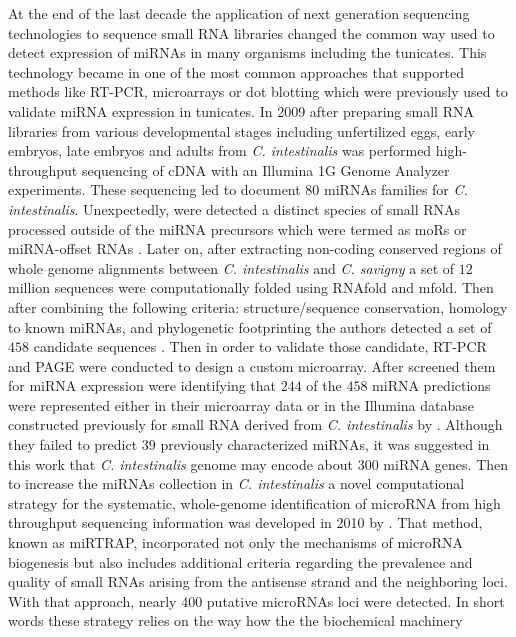\documentclass[graybox]{svmult}
\begin{document}
At the end of the last decade the application of next generation sequencing 
technologies to sequence small RNA libraries changed the common way used to 
detect expression of miRNAs in many organisms including the tunicates. This 
technology became in one of the most common approaches that supported methods 
like RT-PCR, microarrays or dot blotting which were previously used to validate 
miRNA expression in tunicates. In 2009 after preparing small RNA libraries from 
various developmental stages including unfertilized eggs, early embryos, late 
embryos and adults from  \textit{C. intestinalis} was performed high-throughput 
sequencing of cDNA with an Illumina 1G Genome Analyzer experiments. These 
sequencing led to document $80$ miRNAs families for  \textit{C. intestinalis}. 
Unexpectedly, were detected a distinct species of small RNAs processed outside 
of the miRNA precursors which were termed as moRs or miRNA-offset RNAs 
\cite{Shi2009}. Later on, after extracting non-coding conserved regions of whole 
genome alignments between  \textit{C. intestinalis} and \textit{C. savigny} a 
set of $12$ million sequences were computationally folded using RNAfold and 
mfold. Then after combining the following criteria: structure/sequence 
conservation, homology to known miRNAs, and phylogenetic footprinting the 
authors detected a set of $458$ candidate sequences \cite{Keshavan2010}. Then 
in order to validate those candidate, RT-PCR and PAGE were conducted to design 
a custom microarray. After screened them for miRNA expression were identifying 
that $244$ of the $458$ miRNA predictions were represented either in their 
microarray data or in the Illumina database constructed previously for small RNA 
derived from \textit{C. intestinalis} by \cite{Shi2009}. Although they failed to 
predict $39$ previously characterized miRNAs, it was suggested in this work that 
\textit{C. intestinalis} genome may encode about $300$ miRNA genes. Then to 
increase the miRNAs collection in \textit{C. intestinalis} a novel computational 
strategy for the systematic, whole-genome identification of microRNA from high 
throughput sequencing information was developed in 2010 by \cite{Hendrix2010}. 
That method, known as miRTRAP, incorporated not only the mechanisms of microRNA 
biogenesis but also includes additional criteria regarding the prevalence and 
quality of small RNAs arising from the antisense strand and the neighboring 
loci. With that approach, nearly $400$ putative microRNAs loci were detected. In 
short words these strategy relies on the way how the the biochemical machinery 
\end{document}
